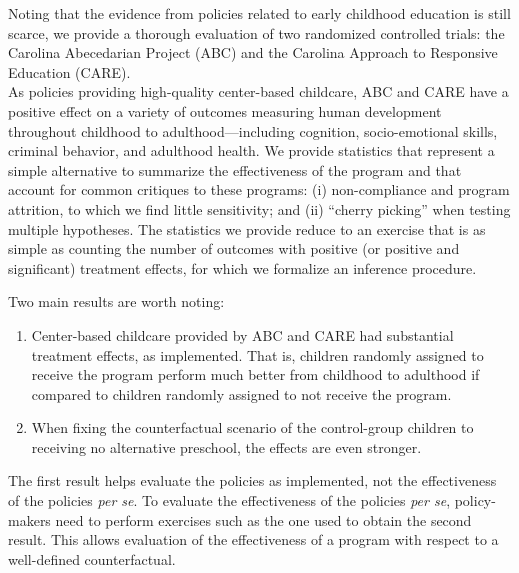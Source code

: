 \noindent Noting that the evidence from policies related to early childhood education is still scarce, we provide a thorough evaluation of two randomized controlled trials: the Carolina Abecedarian Project (ABC) and the Carolina Approach to Responsive Education (CARE).\\ 

\noindent As policies providing high-quality center-based childcare, ABC and CARE have a positive effect on a variety of outcomes measuring human development throughout childhood to adulthood---including cognition, socio-emotional skills, criminal behavior, and adulthood health. We provide statistics that represent a simple alternative to summarize the effectiveness of the program and that account for common critiques to these programs: (i) non-compliance and program attrition, to which we find little sensitivity; and (ii) ``cherry picking'' when testing multiple hypotheses. The statistics we provide reduce to an exercise that is as simple as counting the number of outcomes with positive (or positive and significant) treatment effects, for which we formalize an inference procedure.

\noindent Two main results are worth noting: 

\begin{enumerate}

\item Center-based childcare provided by ABC and CARE had substantial treatment effects, as implemented. That is, children randomly assigned to receive the program perform much better from childhood to adulthood if compared to children randomly assigned to not receive the program.

\item When fixing the counterfactual scenario of the control-group children to receiving no alternative preschool, the effects are even stronger. 

\end{enumerate}

\noindent The first result helps evaluate the policies as implemented, not the effectiveness of the policies \textit{per se}. To evaluate the effectiveness of the policies \textit{per se}, policy-makers need to perform exercises such as the one used to obtain the second result. This allows evaluation of the effectiveness of a program with respect to a well-defined counterfactual. 

\singlespace



 